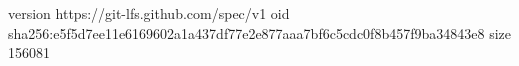 version https://git-lfs.github.com/spec/v1
oid sha256:e5f5d7ee11e6169602a1a437df77e2e877aaa7bf6c5cdc0f8b457f9ba34843e8
size 156081
